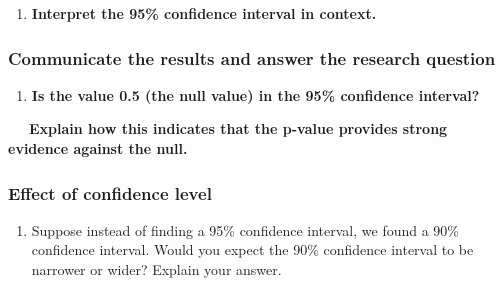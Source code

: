 \documentclass[
]{report}
\providecommand{\tightlist}{%
  \setlength{\itemsep}{0pt}\setlength{\parskip}{0pt}}
\begin{document}
\vspace{0.2in}

\begin{enumerate}
\def\labelenumi{\arabic{enumi}.}
\setcounter{enumi}{9}
\tightlist
\item
  \textbf{Interpret the 95\% confidence interval in context.}
\end{enumerate}

\vspace{.7in}

\hypertarget{communicate-the-results-and-answer-the-research-question-1}{%
\subsubsection*{Communicate the results and answer the research question}\label{communicate-the-results-and-answer-the-research-question-1}}

\begin{enumerate}
\def\labelenumi{\arabic{enumi}.}
\setcounter{enumi}{10}
\tightlist
\item
  \textbf{Is the value 0.5 (the null value) in the 95\% confidence interval?}
\end{enumerate}

\vspace{.2in}

~~~\textbf{Explain how this indicates that the p-value provides strong evidence against the null.}

\newpage

\hypertarget{effect-of-confidence-level}{%
\subsubsection*{Effect of confidence level}\label{effect-of-confidence-level}}

\begin{enumerate}
\def\labelenumi{\arabic{enumi}.}
\setcounter{enumi}{11}
\tightlist
\item
  Suppose instead of finding a 95\% confidence interval, we found a 90\% confidence interval. Would you expect the 90\% confidence interval to be narrower or wider? Explain your answer.
\end{enumerate}

\vspace{0.4in}
\end{document}
